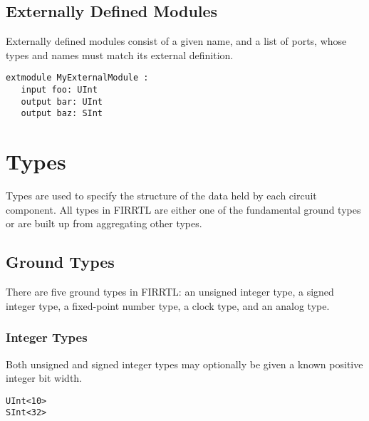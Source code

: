 \documentclass[12pt]{article}
\begin{document}
\subsection{Externally Defined Modules}
Externally defined modules consist of a given name, and a list of ports, whose types and names must match its external definition.

\begin{lstlisting}
extmodule MyExternalModule :
   input foo: UInt
   output bar: UInt
   output baz: SInt
\end{lstlisting}




\section{Types}

Types are used to specify the structure of the data held by each circuit component. All types in FIRRTL are either one of the fundamental ground types or are built up from aggregating other types.

\subsection{Ground Types}

There are five ground types in FIRRTL: an unsigned integer type, a signed integer type, a fixed-point number type, a clock type, and an analog type.

\subsubsection{Integer Types}

Both unsigned and signed integer types may optionally be given a known positive integer bit width.

\begin{lstlisting}
UInt<10>
SInt<32>
\end{lstlisting}
\end{document}
